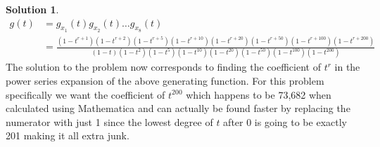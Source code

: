 \documentclass[12pt, letterpaper, onecolumn, conference, final]{IEEEtran}
\theoremstyle{definition}
\newtheorem*{solution*}{Solution}
\theoremstyle{plain}
\begin{document}
\begin{solution*}
\begin{equation*}
\begin{split}
g(t) &= g_{x_1}(t)g_{x_2}(t)\dots g_{x_8}(t) \\
&= \frac{(1-t^{r+1})(1-t^{r+2})(1-t^{r+5})(1-t^{r+10})(1-t^{r+20})(1-t^{r+50})(1-t^{r+100})(1-t^{r+200})}{(1-t)(1-t^2)(1-t^5)(1-t^{10})(1-t^{20})(1-t^{50})(1-t^{100})(1-t^{200})}
\end{split}
\end{equation*}
The solution to the problem now corresponds to finding the coefficient of $t^r$ in the power series expansion of the above generating function. For this problem specifically we want the coefficient of $t^{200}$ which happens to be 73,682 when calculated using Mathematica and can actually be found faster by replacing the numerator with just 1 since the lowest degree of $t$ after 0 is going to be exactly 201 making it all extra junk.
\end{solution*}
\end{document}

